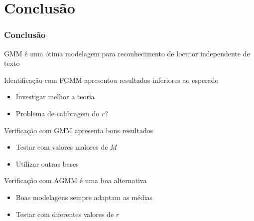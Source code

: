 \section{Conclusão}
\label{sec:conclusion}

\contentscurrent

\begin{frame}
\frametitle{Conclusão}
\begin{description}
    \item GMM é uma ótima modelagem para reconhecimento de locutor independente de texto
    \pause
    \item Identificação com FGMM apresentou resultados inferiores ao esperado
    \pause
    \begin{itemize}
        \item Investigar melhor a teoria
        \item Problema de calibragem do $r$?
        \pause
    \end{itemize}
    \item Verificação com GMM apresenta bons resultados
    \pause
    \begin{itemize}
        \item Testar com valores maiores de $M$
        \item Utilizar outras bases
        \pause
    \end{itemize}
    \item Verificação com AGMM é uma boa alternativa
    \pause
    \begin{itemize}
        \item Boas modelagens sempre adaptam as médias
        \item Testar com diferentes valores de $r$
    \end{itemize}
\end{description}
\end{frame}